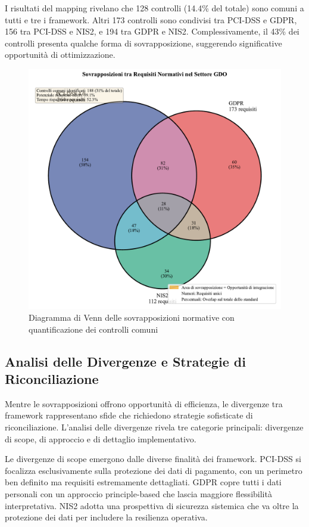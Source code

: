 I risultati del mapping rivelano che 128 controlli (14.4\% del totale) sono comuni a tutti e tre i framework. Altri 173 controlli sono condivisi tra PCI-DSS e GDPR, 156 tra PCI-DSS e NIS2, e 194 tra GDPR e NIS2. Complessivamente, il 43\% dei controlli presenta qualche forma di sovrapposizione, suggerendo significative opportunità di ottimizzazione.
\begin{figure}[htbp]
\centering
\includegraphics[width=\textwidth]{thesis_figures/cap4/figura_4_1_venn_normative.pdf}
\caption{Diagramma di Venn delle sovrapposizioni normative con quantificazione dei controlli comuni}
\label{fig:venn_normative}
\end{figure}

\subsection{Analisi delle Divergenze e Strategie di Riconciliazione}

Mentre le sovrapposizioni offrono opportunità di efficienza, le divergenze tra framework rappresentano sfide che richiedono strategie sofisticate di riconciliazione. L'analisi delle divergenze rivela tre categorie principali: divergenze di scope, di approccio e di dettaglio implementativo.

Le divergenze di scope emergono dalle diverse finalità dei framework. PCI-DSS si focalizza esclusivamente sulla protezione dei dati di pagamento, con un perimetro ben definito ma requisiti estremamente dettagliati. GDPR copre tutti i dati personali con un approccio principle-based che lascia maggiore flessibilità interpretativa. NIS2 adotta una prospettiva di sicurezza sistemica che va oltre la protezione dei dati per includere la resilienza operativa.

